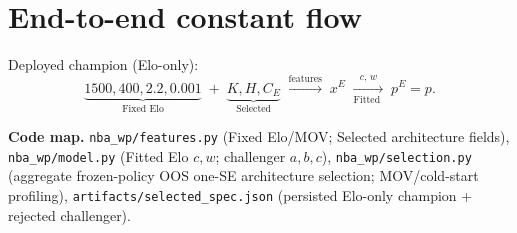 \documentclass[10pt]{article}
\newcommand{\code}[1]{\texttt{#1}}
\begin{document}
\section{End-to-end constant flow}

Deployed champion (Elo-only):
\[
\underbrace{1500,400,2.2,0.001}_{\text{Fixed Elo}}
\;+\;
\underbrace{K,H,C_E}_{\text{Selected}}
\;\xrightarrow{\text{features}}\;
x^{E}
\;\xrightarrow[\text{Fitted }]{c,\,w}\;
p^{E}=p.
\]

\noindent\textbf{Code map.}
\code{nba\_wp/features.py} (Fixed Elo/MOV; Selected architecture fields),
\code{nba\_wp/model.py} (Fitted Elo \(c,w\); challenger \(a,b,c\)),
\code{nba\_wp/selection.py} (aggregate frozen-policy OOS one-SE architecture selection; MOV/cold-start profiling),
\code{artifacts/selected\_spec.json} (persisted Elo-only champion + rejected challenger).
\end{document}
